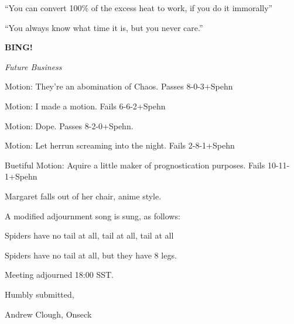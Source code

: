 \documentclass[12pt]{article}
\newcommand{\bing}{{\bf BING!} }
\newcommand{\goto}[1]{\bing \vskip 12pt \centerline{{\em{#1}}}}
\begin{document}
``You can convert 100\% of the excess heat to work, if you do it immorally''

``You always know what time it is, but you never care.''

\goto{Future Business}

Motion:  They're an abomination of Chaos. Passes 8-0-3+Spehn

Motion:  I made a motion.  Fails 6-6-2+Spehn

Motion:  Dope.  Passes 8-2-0+Spehn.

Motion:  Let herrun screaming into the night.  Fails 2-8-1+Spehn

Buetiful Motion:  Aquire a little maker of prognostication purposes.  Fails 10-11-1+Spehn

Margaret falls out of her chair, anime style.

A modified adjournment song is sung, as follows:

Spiders have no tail at all, tail at all, tail at all

Spiders have no tail at all, but they have 8 legs.

\vspace{12pt}

\noindent
Meeting adjourned 18:00 SST.

\vspace{18pt}

\centerline{Humbly submitted,}
\centerline{Andrew Clough, Onseck}
\end{document}
